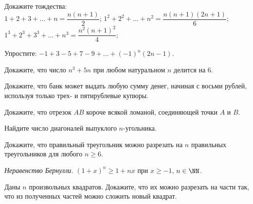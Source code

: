 %
%

\begin{problems}

\item
Докажите тождества:
\\
\sbp $1 + 2 + 3 + \ldots + n = \dfrac{n (n + 1)}{2}$;
\qquad
\sbp $1^2 + 2^2 + \ldots + n^2 = \dfrac{n (n + 1) (2 n + 1)}{6}$;
\\[0.5ex]
\sbp $1^3 + 2^3 + 3^3 + \ldots + n^3 = \dfrac{n^2 (n + 1)^2}{4}$;

\item
Упростите: $-1 + 3 - 5 + 7 - 9 + \ldots + (-1)^n (2 n - 1)$.

\item
Докажите, что число $n^3 + 5 n$ при любом натуральном $n$ делится на 6.

\item
Докажите, что банк может выдать любую сумму денег, начиная с восьми рублей,
используя только трех- и пятирублевые купюры.

\item
Докажите, что отрезок $AB$ короче всякой ломаной, соединяющей точки $A$ и $B$.

\item
Найдите число диагоналей выпуклого $n$-угольника.

\item
Докажите, что правильный треугольник можно разрезать на $n$ правильных
треугольников для любого $n\geqslant 6$.

\item\emph{Неравенство Бернулли.}\;
\(
    (1 + x)^n \geq 1 + n x
\)\;
при $x \geq -1$, $n \in \NN$.

\item
Даны $n$ произвольных квадратов.
Докажите, что их можно разрезать на части так, что из полученных частей можно
сложить новый квадрат.

\end{problems}

